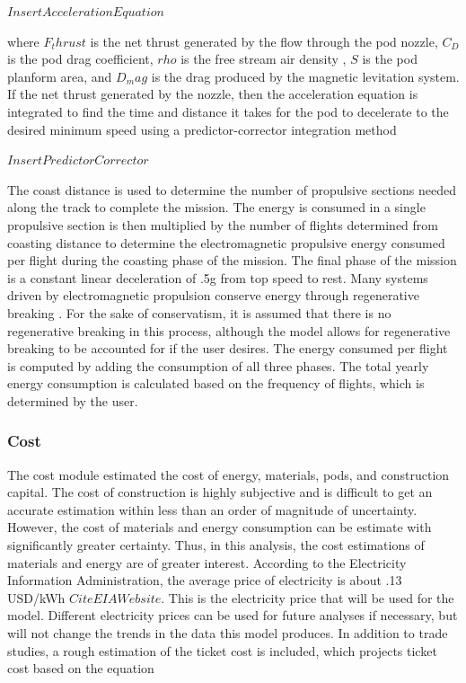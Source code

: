 $Insert Acceleration Equation$

where $F_thrust$ is the net thrust generated by the flow through the pod nozzle, $C_D$ is the pod drag coefficient, $rho$ is the free stream air density , $S$ is the pod planform area, and $D_mag$ is the drag produced by the magnetic levitation system. If the net thrust generated by the nozzle, then the acceleration equation is integrated to find the time and distance it takes for the pod to decelerate to the desired minimum speed using a predictor-corrector integration method

$Insert Predictor Corrector$

The coast distance is used to determine the number of propulsive sections needed along the track to complete the mission. The energy is consumed in a single propulsive section is then multiplied by the number of flights determined from coasting distance to determine the electromagnetic propulsive energy consumed per flight during the coasting phase of the mission. The final phase of the mission is a constant linear deceleration of .5g from top speed to rest. Many systems driven by electromagnetic propulsion conserve energy through regenerative breaking \cite{inductrack}. For the sake of conservatism, it is assumed that there is no regenerative breaking in this process, although the model allows for regenerative breaking to be accounted for if the user desires. The energy consumed per flight is computed by adding the consumption of all three phases. The total yearly energy consumption is calculated based on the frequency of flights, which is determined by the user.

\subsubsection{Cost}
The cost module estimated the cost of energy, materials, pods, and construction capital. The cost of construction is highly subjective and is difficult to get an accurate estimation within less than an order of magnitude of uncertainty. However, the cost of materials and energy consumption can be estimate with significantly greater certainty. Thus, in this analysis, the cost estimations of materials and energy are of greater interest. According to the Electricity Information Administration, the average price of electricity is about .13 USD/kWh $Cite EIA Website$. This is the electricity price that will be used for the model. Different electricity prices can be used for future analyses if necessary, but will not change the trends in the data this model produces. In addition to trade studies, a rough estimation of the ticket cost is included, which projects ticket cost based on the equation

